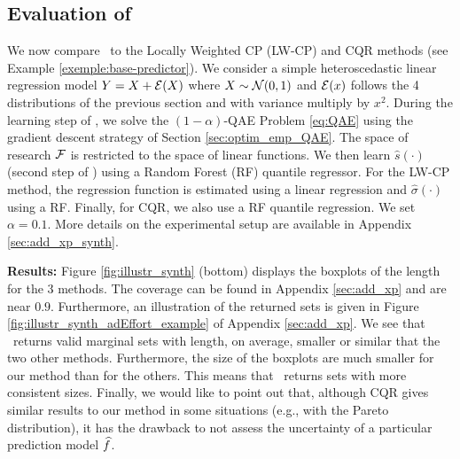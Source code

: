 \subsection{Evaluation of \methodAD} \label{sec:xpADEffort}
We now compare \methodAD~to the Locally Weighted CP (LW-CP) and CQR methods (see Example \ref{exemple:base-predictor}).
%
We consider a simple heteroscedastic linear regression model $Y = X + {\cal E}(X)$ where $X \sim {\cal N}(0, 1)$ and ${\cal E}(x)$ follows the 4 distributions of the previous section and with variance multiply by $x^2$. %
During the learning step of \methodAD, we solve the $(1-\alpha)$-QAE Problem \eqref{eq:QAE} using the gradient descent strategy of Section \ref{sec:optim_emp_QAE}. The space of research $\mathcal{F}$ is restricted to the space of linear functions.  We then learn $\hat{s}(\cdot)$ (second step of \methodAD) using a Random Forest (RF) quantile regressor. For the LW-CP method, the regression function is estimated using a linear regression and $\hat{\sigma}(\cdot)$ using a RF. Finally, for CQR, we also use a RF quantile regression. We set $\alpha = 0.1$. More details on the experimental setup are available in Appendix \ref{sec:add_xp_synth}.

\textbf{Results:} Figure \ref{fig:illustr_synth} (bottom) displays the boxplots of the length for the 3 methods. The coverage can be found in Appendix \ref{sec:add_xp} and are near $0.9$. Furthermore, an illustration of the returned sets is given in Figure \ref{fig:illustr_synth_adEffort_example} of Appendix \ref{sec:add_xp}. We see that \methodAD~returns valid marginal sets with length, on average, smaller or similar that the two other methods. Furthermore, the size of the boxplots are much smaller for our method than for the others. This means that \methodAD~returns sets with more consistent sizes. Finally, we would like to point out that, although CQR gives similar results to our method in some situations (e.g., with the Pareto distribution), it has the drawback to not assess the uncertainty of a particular prediction model ${\widehat{f}}$.%

